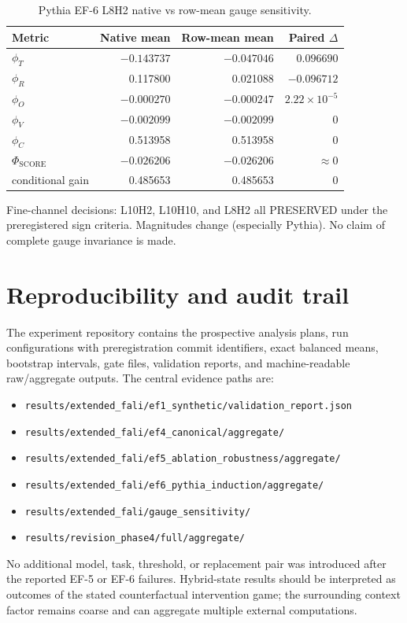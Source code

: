 \documentclass[preprint,12pt,authoryear]{elsarticle}
\begin{document}
\begin{table}[h]
\centering
\caption{Pythia EF-6 L8H2 native vs row-mean gauge sensitivity.}
\begin{tabular}{lrrr}
\toprule
Metric & Native mean & Row-mean mean & Paired $\Delta$ \\
\midrule
$\phi_T$ & $-0.143737$ & $-0.047046$ & $0.096690$ \\
$\phi_R$ & 0.117800 & 0.021088 & $-0.096712$ \\
$\phi_O$ & $-0.000270$ & $-0.000247$ & $2.22\times10^{-5}$ \\
$\phi_V$ & $-0.002099$ & $-0.002099$ & $0$ \\
$\phi_C$ & 0.513958 & 0.513958 & $0$ \\
$\Phi_{\mathrm{SCORE}}$ & $-0.026206$ & $-0.026206$ & $\approx0$ \\
conditional gain & 0.485653 & 0.485653 & $0$ \\
\bottomrule
\end{tabular}
\end{table}

Fine-channel decisions: L10H2, L10H10, and L8H2 all PRESERVED under the
preregistered sign criteria. Magnitudes change (especially Pythia). No claim of
complete gauge invariance is made.

\section{Reproducibility and audit trail}

The experiment repository contains the prospective analysis plans, run
configurations with preregistration commit identifiers, exact balanced means,
bootstrap intervals, gate files, validation reports, and machine-readable raw/aggregate
outputs. The central evidence paths are:

\begin{itemize}
\item \texttt{results/extended\_fali/ef1\_synthetic/validation\_report.json}
\item \texttt{results/extended\_fali/ef4\_canonical/aggregate/}
\item \texttt{results/extended\_fali/ef5\_ablation\_robustness/aggregate/}
\item \texttt{results/extended\_fali/ef6\_pythia\_induction/aggregate/}
\item \texttt{results/extended\_fali/gauge\_sensitivity/}
\item \texttt{results/revision\_phase4/full/aggregate/}
\end{itemize}

No additional model, task, threshold, or replacement pair was introduced after the
reported EF-5 or EF-6 failures. Hybrid-state results should be interpreted as outcomes
of the stated counterfactual intervention game; the surrounding context factor remains
coarse and can aggregate multiple external computations.
\end{document}
